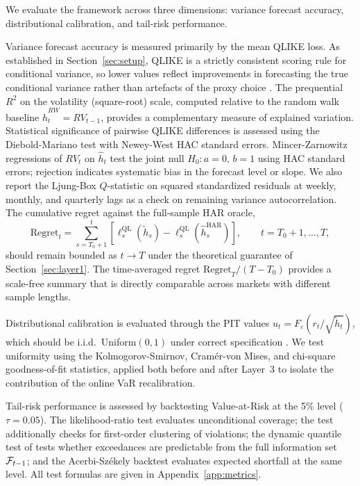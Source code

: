 We evaluate the framework across three dimensions: variance forecast accuracy, distributional calibration, and tail-risk performance.

Variance forecast accuracy is measured primarily by the mean QLIKE loss. As established in Section~\ref{sec:setup}, QLIKE is a strictly consistent scoring rule for conditional variance, so lower values reflect  improvements in forecasting the true conditional variance rather than artefacts of the proxy choice \citep{patton2011data}. The prequential $R^2$ on the volatility (square-root) scale, computed relative to the random walk baseline $\hat{h}_t^{RW} = RV_{t-1}$, provides a complementary measure of explained variation. Statistical significance of pairwise QLIKE differences is assessed using the Diebold-Mariano test \citep{DieboldMariano1995} with Newey-West HAC standard errors. Mincer-Zarnowitz regressions of $RV_t$ on $\hat{h}_t$ test the joint null $H_0\colon a=0,\,b=1$ using HAC standard errors; rejection indicates systematic bias in the forecast level or slope. We also report the Ljung-Box $Q$-statistic on squared standardized residuals at weekly, monthly, and quarterly lags as a check on remaining variance autocorrelation. The cumulative regret against the full-sample HAR oracle,
\begin{equation}\label{eq:cumregret}
    \mathrm{Regret}_t = \sum_{s=T_0+1}^{t} \left[ \ell_s^{\mathrm{QL}}(\tilde{h}_s) - \ell_s^{\mathrm{QL}}(\hat{h}_s^{\mathrm{HAR}}) \right], \qquad t = T_0+1, \ldots, T,
\end{equation}
should remain bounded as $t \to T$ under the theoretical guarantee of Section~\ref{sec:layer1}. The time-averaged regret $\mathrm{Regret}_T / (T - T_0)$ provides a scale-free summary that is directly comparable across markets with different sample lengths.

Distributional calibration is evaluated through the PIT values $u_t = F_\varepsilon(r_t/\sqrt{\tilde{h}_t})$, which should be i.i.d.\ Uniform$(0,1)$ under correct specification \citep{diebold1998evaluating}. We test uniformity using the Kolmogorov-Smirnov, Cram\'{e}r-von Mises, and chi-square goodness-of-fit statistics, applied both before and after Layer~3 to isolate the contribution of the online VaR recalibration.

Tail-risk performance is assessed by backtesting Value-at-Risk at the 5\% level ($\tau = 0.05$). The \citet{Kupiec1995} likelihood-ratio test evaluates unconditional coverage; the \citet{Christoffersen1998} test additionally checks for first-order clustering of violations; the dynamic quantile test of \citet{engle2004caviar} tests whether exceedances are predictable from the full information set $\mathcal{F}_{t-1}$; and the Acerbi-Sz\'{e}kely backtest \citep{acerbi2014backtesting} evaluates expected shortfall at the same level. All test formulas are given in Appendix~\ref{app:metrics}.

